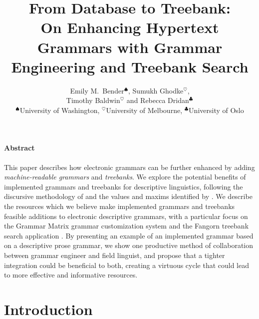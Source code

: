 \documentclass[12pt]{article}
\title{From Database to Treebank:\\ On Enhancing Hypertext Grammars with
Grammar Engineering and Treebank Search}
\author{Emily M.\ Bender$^\spadesuit$, Sumukh Ghodke$^\heartsuit$,\\ Timothy Baldwin$^\heartsuit$ and Rebecca Dridan$^\clubsuit$\\
\normalsize $^\spadesuit$University of Washington, $^\heartsuit$University of Melbourne, $^\clubsuit$University of Oslo}
\date{}
\begin{document}
\maketitle

\newpage

\paragraph{Abstract}
This paper describes how electronic grammars can be further enhanced
by adding {\it machine-readable grammars} and {\it treebanks}.  We
explore the potential benefits of implemented grammars and treebanks
for descriptive linguistics, following the discursive methodology of
 and the values and maxims identified by
.  We describe the resources which we believe
make implemented grammars and treebanks feasible additions to
electronic descriptive grammars, with a particular focus on the
Grammar Matrix grammar customization system
\cite{Ben:Dre:Fok:Pou:Sal:10} and the Fangorn treebank search
application \cite{Gho:Bir:10}.  By presenting an example of an
implemented grammar based on a descriptive prose grammar, we show one
productive method of collaboration between grammar engineer and field
linguist, and propose that a tighter integration could be beneficial
to both, creating a virtuous cycle that could lead to more effective
and informative resources.

\newpage

\section{Introduction}
\end{document}
